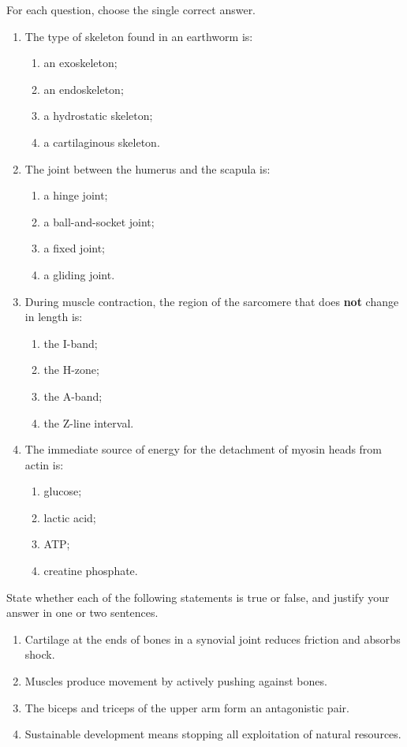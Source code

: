 \documentclass[11pt]{article}
\begin{document}
\begin{exercice}
For each question, choose the single correct answer.
\begin{enumerate}
\item The type of skeleton found in an earthworm is:
\begin{enumerate}
\item an exoskeleton;
\item an endoskeleton;
\item a hydrostatic skeleton;
\item a cartilaginous skeleton.
\end{enumerate}
\item The joint between the humerus and the scapula is:
\begin{enumerate}
\item a hinge joint;
\item a ball-and-socket joint;
\item a fixed joint;
\item a gliding joint.
\end{enumerate}
\item During muscle contraction, the region of the sarcomere that does \textbf{not} change in length is:
\begin{enumerate}
\item the I-band;
\item the H-zone;
\item the A-band;
\item the Z-line interval.
\end{enumerate}
\item The immediate source of energy for the detachment of myosin heads from actin is:
\begin{enumerate}
\item glucose;
\item lactic acid;
\item ATP;
\item creatine phosphate.
\end{enumerate}
\end{enumerate}
\end{exercice}

\begin{exercice}
State whether each of the following statements is true or false, and justify your answer in one or two sentences.
\begin{enumerate}
\item Cartilage at the ends of bones in a synovial joint reduces friction and absorbs shock.
\item Muscles produce movement by actively pushing against bones.
\item The biceps and triceps of the upper arm form an antagonistic pair.
\item Sustainable development means stopping all exploitation of natural resources.
\end{enumerate}
\end{exercice}
\end{document}
